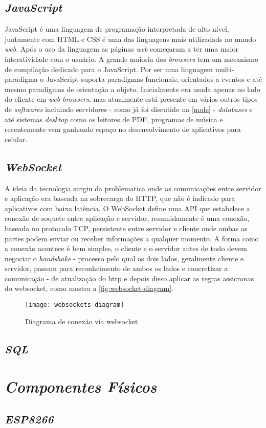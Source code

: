\subsection[\textit{JavaScript}]{\textit{JavaScript}}\label{js}
JavaScript é uma linguagem de programação interpretada de alto nível, juntamente com HTML e CSS é uma das linguagens mais utilizadads no mundo \textit{web}.
Após o uso da linguagem as páginas \textit{web} começaram a ter uma maior interatividade com o usuário. A grande maioria dos \textit{browsers} tem um
mecanismo de compilação dedicado para o JavaScript. Por ser uma linguagem multi-paradigma o JavaScript suporta paradigmas funcionais, orientados a eventos 
e até mesmo paradigmas de orientação a objeto.
Inicialmente era usada apenas no lado do cliente em \textit{web browsers}, mas atualmente está presente em vários outros tipos de \textit{softwares} incluindo
servidores - como já foi discutido na \autoref{node} - \textit{databases} e até sistemas \textit{desktop} como os leitores de PDF, programas de música e recentemente
vem ganhando espaço no desenvolvimento de aplicativos para celular.

\subsection[\textit{WebSocket}]{\textit{WebSocket}}\label{websocket}
A ideia da tecnologia surgiu da problematica onde as comunicações entre servidor e aplicação era baseada na sobrecarga do HTTP, que não é indicado para aplicativos
com baixa latência. O WebSocket define uma API que estabelece a conexão de soquete entre aplicação e servidor, resumidamente é uma conexão, baseada no protocolo TCP, persistente
entre servidor e cliente onde ambas as partes podem enviar ou receber informações a qualquer momento. A forma como a conexão acontece é bem simples,
o cliente e o servidor antes de tudo devem negociar o \textit{handshake} - processo pelo qual os dois lados, geralmente cliente e servidor, passam para
reconhcimento de ambos os lados e concretizar a comunicação - de atualização do http e depois disso aplicar as regras assicronas do websocket, como mostra
a \autoref{fig:websocket-diagram}.

\begin{figure}[h!]
	\texttt{[image: websockets-diagram]}
	\centering
	\caption[Diagrama de conexão via websocket]{Diagrama de conexão via websocket}
	\label{fig:websocket-diagram}
\end{figure}
\FloatBarrier


\subsection[\textit{SQL}]{\textit{SQL}}\label{sql}

\section[\textit{Componentes Físicos}]{\textit{Componentes Físicos}}\label{comp-fisico}
\subsection[\textit{ESP8266}]{\textit{ESP8266}}\label{esp}

